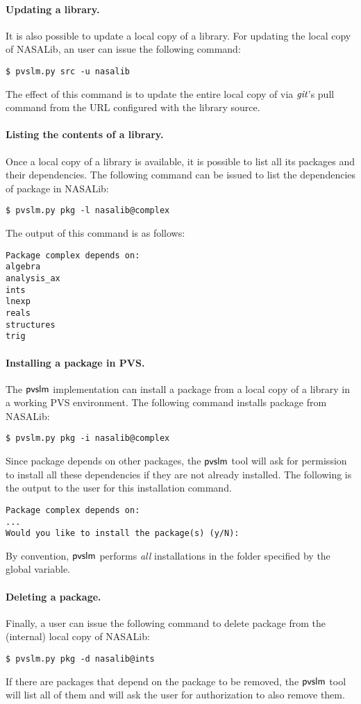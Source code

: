 \paragraph{Updating a library.} It is also possible to update a local
copy of a library. For updating the local copy of NASALib, an user can
issue the following command:
%
\begin{verbatim}
$ pvslm.py src -u nasalib
\end{verbatim}
%
The effect of this command is to update the entire local copy of
 via $\textit{git}$'s pull command from the URL configured with
the library source.

\paragraph{Listing the contents of a library.} Once a local
copy of a library is available, it is possible to list all its
packages and their dependencies. The following command can be issued
to list the dependencies of package  in NASALib:
%
\begin{verbatim}
$ pvslm.py pkg -l nasalib@complex
\end{verbatim}
%
The output of this command is as follows:
%
{\small\begin{verbatim}
Package complex depends on:
algebra
analysis_ax
ints
lnexp
reals
structures
trig
\end{verbatim}}

\paragraph{Installing a package in PVS.} The $\textsf{pvslm}$ implementation
can install a package from a local copy of a library in a working PVS
environment. The following command installs package  from
NASALib:
%
\begin{verbatim}
$ pvslm.py pkg -i nasalib@complex
\end{verbatim}
%
Since package  depends on other packages, the $\textsf{pvslm}$
tool will ask for permission to install all these dependencies if they
are not already installed. The following is the output to the user for
this installation command.
%
{\small\begin{verbatim}
Package complex depends on:
...
Would you like to install the package(s) (y/N): 
\end{verbatim}}
%
By convention, $\textsf{pvslm}$ performs {\em all} installations in the folder
specified by the  global variable.

\paragraph{Deleting a package.} Finally, a user can issue the following
command to delete package  from the (internal) local copy of
NASALib:
%
\begin{verbatim}
$ pvslm.py pkg -d nasalib@ints
\end{verbatim}
%
If there are packages that depend on the package to be removed, the
$\textsf{pvslm}$ tool will list all of them and will ask the user for
authorization to also remove them.
